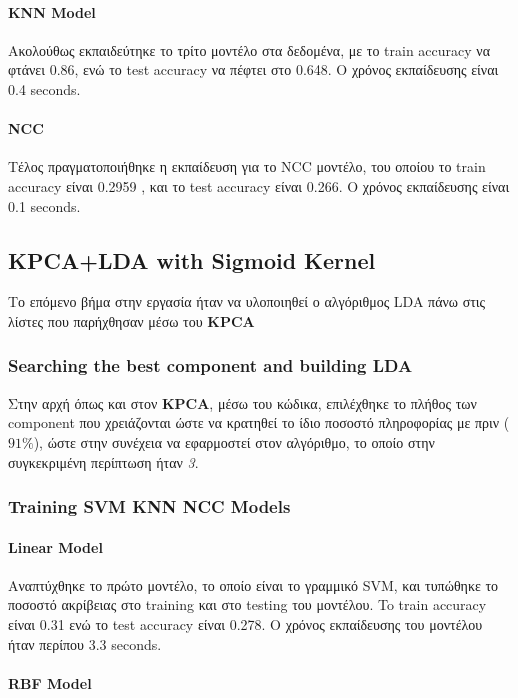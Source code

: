 \paragraph{KNN Model}
Ακολούθως εκπαιδεύτηκε το τρίτο μοντέλο στα δεδομένα, με το train accuracy να φτάνει 0.86, ενώ το test accuracy να πέφτει στο 0.648. Ο χρόνος εκπαίδευσης είναι 0.4 seconds.
\paragraph{NCC}
Τέλος πραγματοποιήθηκε η εκπαίδευση για το NCC μοντέλο, του οποίου το train accuracy είναι 0.2959 , και το test accuracy είναι 0.266. Ο χρόνος εκπαίδευσης είναι 0.1 seconds.
\subsection{KPCA+LDA with Sigmoid Kernel}

Το επόμενο βήμα στην εργασία ήταν να υλοποιηθεί ο αλγόριθμος LDA πάνω στις λίστες που παρήχθησαν μέσω του \textbf{KPCA}
\subsubsection{Searching the best component  and building LDA  }

Στην αρχή όπως και στον \textbf{KPCA}, μέσω του κώδικα, επιλέχθηκε το πλήθος των component που χρειάζονται ώστε να κρατηθεί το ίδιο ποσοστό πληροφορίας με πριν ($91\%$), ώστε στην συνέχεια να εφαρμοστεί στον αλγόριθμο, το οποίο στην συγκεκριμένη περίπτωση ήταν \emph{3}.

\subsubsection{Training SVM KNN NCC Models}

\paragraph{Linear Model}

Αναπτύχθηκε το πρώτο μοντέλο, το οποίο είναι το γραμμικό SVM, και
τυπώθηκε το ποσοστό ακρίβειας στο training και στο testing του μοντέλου. To train accuracy είναι 0.31 ενώ το test accuracy είναι 0.278. Ο χρόνος εκπαίδευσης του μοντέλου ήταν περίπου 3.3 seconds.

\paragraph{RBF Model}

